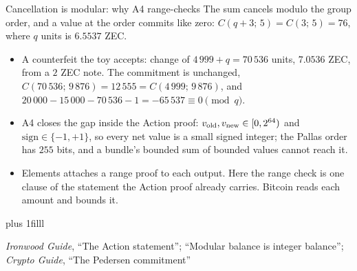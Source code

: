 \documentclass[aspectratio=169,11pt]{beamer}
\newcommand{\src}[1]{\par\vskip0pt plus 1filll
  {\fontsize{6}{7.2}\selectfont\color{arbdim}\raggedright #1\par}}
\begin{document}
\begin{frame}{Cancellation is modular: why A4 range-checks}
The sum cancels modulo the group order, and a value at the order
commits like zero: $C(q + 3;\, 5) = C(3;\, 5) = 76$, where $q$ units
is $6.5537$ ZEC.
\begin{itemize}
\item A counterfeit the toy accepts: change of $4\,999 + q = 70\,536$
  units, $7.0536$ ZEC, from a $2$ ZEC note. The commitment is
  unchanged, $C(70\,536;\, 9\,876) = 12\,555 = C(4\,999;\, 9\,876)$,
  and $20\,000 - 15\,000 - 70\,536 - 1 = -65\,537 \equiv 0 \pmod q$.
\item A4 closes the gap inside the Action proof: $v_{\mathrm{old}}, v_{\mathrm{new}} \in
  [0, 2^{64})$ and $\mathrm{sign} \in \{-1, +1\}$, so every net value
  is a small signed integer; the Pallas order has $255$ bits, and a
  bundle's bounded sum of bounded values cannot reach it.
\item Elements attaches a range proof to each output. Here the range
  check is one clause of the statement the Action proof already
  carries. Bitcoin reads each amount and bounds it.
\end{itemize}
\src{\emph{Ironwood Guide}, ``The Action statement'';
``Modular balance is integer balance''; \emph{Crypto Guide}, ``The Pedersen
commitment''}
\end{frame}
\end{document}
